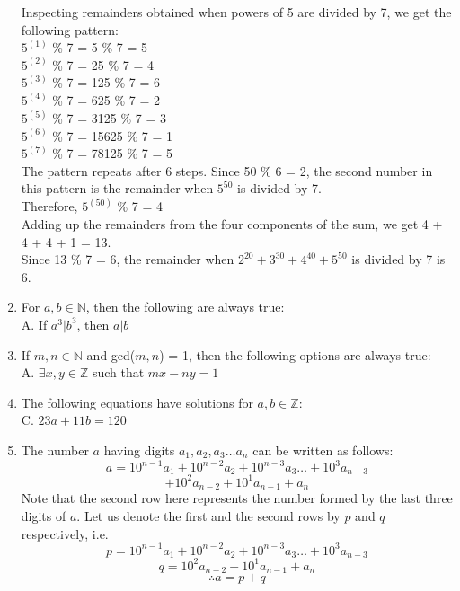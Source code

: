 \documentclass[a4paper,12pt]{article} %
\begin{document}
\begin{enumerate}
	\subitem Inspecting remainders obtained when powers of 5 are divided by 7, we get the following pattern:\\
		$5^{(1)}$ \% 7 = 5 \% 7 = 5\\
		$5^{(2)}$ \% 7 = 25 \% 7 = 4\\
		$5^{(3)}$ \% 7 = 125 \% 7 = 6\\
		$5^{(4)}$ \% 7 = 625 \% 7 = 2\\
		$5^{(5)}$ \% 7 = 3125 \% 7 = 3\\
		$5^{(6)}$ \% 7 = 15625 \% 7 = 1\\
		$5^{(7)}$ \% 7 = 78125 \% 7 = 5\\
		The pattern repeats after 6 steps. Since 50 \% 6 = 2, the second number in this pattern is the remainder when $5^{50}$ is divided by 7.\\
		Therefore, $5^{(50)}$ \% 7 = 4\\
	
	Adding up the remainders from the four components of the sum, we get 4 + 4 + 4 + 1 = 13.\\
	Since 13 \% 7 = 6, the remainder when $2^{20} + 3^{30} + 4^{40} + 5^{50}$ is divided by 7 is 6.\\

\item For $a, b \in \mathbb{N}$, then the following are always true:\\
	\subitem A. If $a^3|b^3$, then $a|b$

\item If $m, n \in \mathbb{N}$ and gcd($m, n$) = 1, then the following options are always true:\\
	\subitem A. $\exists x, y \in \mathbb{Z}$ such that $mx - ny = 1$

\item The following equations have solutions for $a, b \in \mathbb{Z}$:\\
	\subitem C. $23a + 11b = 120$

\item The number $a$ having digits $a_1, a_2, a_3 \dots a_n$ can be written as follows:\\
	$$ a = 10^{n - 1} a_1 + 10^{n - 2} a_2 + 10^{n - 3} a_3 \dots + 10^3 a_{n - 3} $$
	$$ + 10^2 a_{n - 2} + 10^1 a_{n - 1} + a_n $$
	Note that the second row here represents the number formed by the last three digits of $a$. Let us denote the first and the second rows by $p$ and $q$ respectively, i.e.
		$$ p = 10^{n - 1} a_1 + 10^{n - 2} a_2 + 10^{n - 3} a_3 \dots + 10^3 a_{n - 3} $$
		$$ q = 10^2 a_{n - 2} + 10^1 a_{n - 1} + a_n $$
		$$\therefore a = p + q$$



\end{enumerate}
\end{document}
